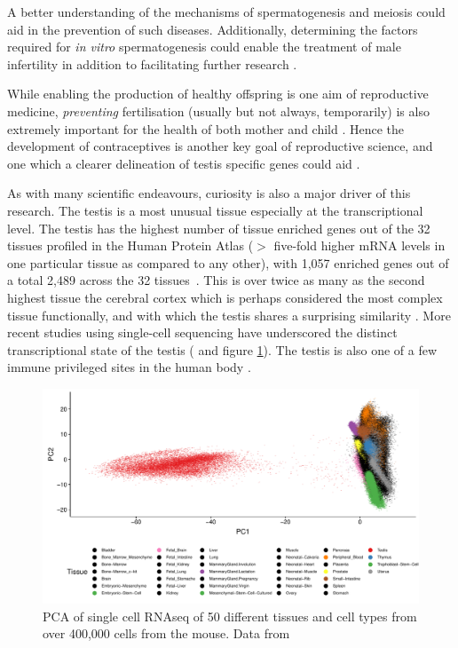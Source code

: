 A better understanding of the mechanisms of spermatogenesis and meiosis could aid in the prevention of such diseases.
Additionally, determining the factors required for \emph{in vitro} spermatogenesis could enable the treatment of male infertility in addition to facilitating further research \parencite{Zhou2016Complete}.

While enabling the production of healthy offspring is one aim of reproductive medicine, \emph{preventing} fertilisation (usually but not always, temporarily) is also extremely important for the health of both mother and child \parencite{Cleland2012Contraception}.
Hence the development of contraceptives is another key goal of reproductive science, and one which a clearer delineation of testis specific genes could aid \parencite{Schultz2003multitude}.


As with many scientific endeavours, curiosity is also a major driver of this research.
The testis is a most unusual tissue especially at the transcriptional level.
The testis has the highest number of tissue enriched genes out of the 32 tissues profiled in the Human Protein Atlas ($>$ five-fold higher mRNA levels in one particular tissue as compared to any other), with 1,057 enriched genes out of a total 2,489 across the 32 tissues~\parencite{Djureinovic2014human,Mele2015Human, Uhlen2015Tissuebased, Uhlen2016Transcriptomics, TheHumanProteinAtlas2019human}.
This is over twice as many as the second highest tissue the cerebral cortex which is perhaps considered the most complex tissue functionally, and with which the testis shares a surprising similarity \parencite{Guo2005Transcriptomic, Djureinovic2014human, Uhlen2015Tissuebased}.
More recent studies using single-cell sequencing have underscored the distinct transcriptional state of the testis (\cite{Han2018Mapping} and figure \ref{fig:MCA_PCA}).
The testis is also one of a few immune privileged sites in the human body \parencite{Fijak2006testis}.


\begin{figure}[H]
	\centering
	\includegraphics[width=\textwidth]{figures/intro/MCA_PCA.pdf}
	\caption[Testis PCA (MCA)]{PCA of single cell RNAseq of 50 different tissues and cell types from over 400,000 cells from the mouse. Data from~\cite{Han2018Mapping}}
	\label{fig:MCA_PCA}
\end{figure}


